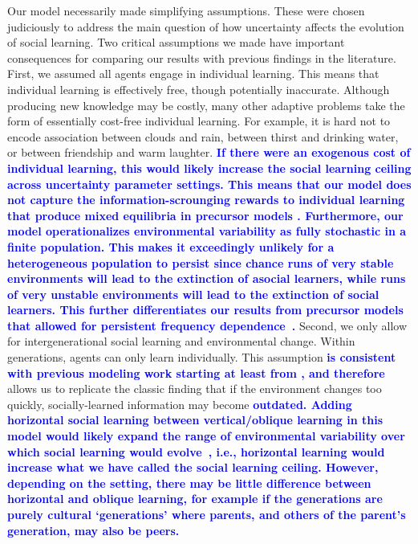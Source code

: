 \documentclass[letterpaper,11.5pt]{scrartcl}
\newcommand{\edit}[1]{{\bfseries \textcolor{blue} {#1}}}
\begin{document}
Our model necessarily made simplifying assumptions. These were chosen judiciously to
address the main question of how uncertainty affects the evolution of social
learning. Two critical assumptions we made have important consequences for comparing
our results with previous findings in the literature. First, we assumed all agents
engage in individual learning. This means that individual learning is effectively
free, though potentially inaccurate. Although producing new knowledge may be costly,
many other adaptive problems take the form of essentially cost-free individual
learning. For example, it is hard not to encode association between clouds and rain,
between thirst and drinking water, or between friendship and warm laughter.
\edit{If there were an exogenous cost of individual learning, this would likely
  increase the social learning ceiling across uncertainty parameter settings.
This means that our model does not capture the information-scrounging rewards to individual learning that produce mixed equilibria in precursor models \cite{Rogers1988}. Furthermore, our model operationalizes environmental variability as fully stochastic in a finite population. This makes it exceedingly unlikely for a heterogeneous population to persist since chance runs of very stable environments will lead to the extinction of asocial learners, while runs of very unstable environments will lead to the extinction of social learners. This further differentiates our results from precursor
models that allowed for persistent frequency
dependence~\citep{BoydRicherson1985,Rogers1988,Feldman1996}.} Second, we only allow for
intergenerational social learning and environmental change. Within generations,
agents can only learn individually. This assumption \edit{is consistent with previous modeling work starting at least from \cite{Rogers1988}, and therefore} allows us to replicate the
classic finding that if the environment changes too quickly, socially-learned
information may become \edit{outdated. Adding horizontal social learning between
vertical/oblique learning in this model would likely expand the range of
environmental variability over which social learning would
evolve~\citep{Turner2022}, i.e., horizontal learning would increase what we have
called the social learning ceiling. However, depending on the
setting, there may be little difference between horizontal and oblique learning, for
example if the generations are purely cultural ‘generations’ where parents, and
others of the parent's generation, may also be peers.}
\end{document}

